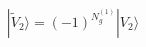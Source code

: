 \begin{equation}
|\tilde{V}_2\rangle = (-1)^{N_g^{(1)}} |V_2\rangle
\label{eq:extra-sign}
\end{equation}

